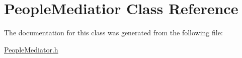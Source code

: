 \hypertarget{classPeopleMediatior}{}\section{People\+Mediatior Class Reference}
\label{classPeopleMediatior}


The documentation for this class was generated from the following file\+:\begin{DoxyCompactItemize}
\item 
\hyperlink{PeopleMediator_8h}{People\+Mediator.\+h}\end{DoxyCompactItemize}
